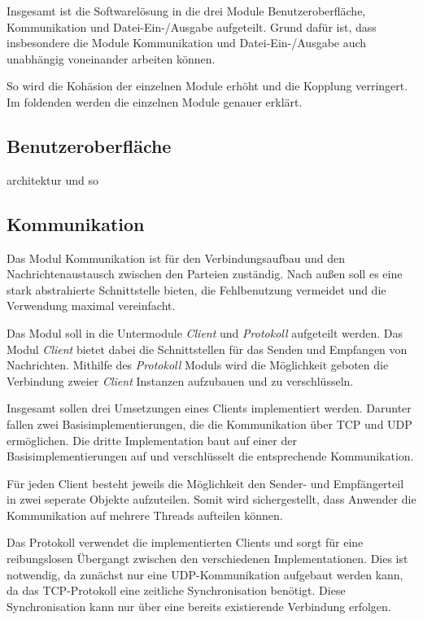 \label{sc:architektur}

Insgesamt ist die Softwarelösung in die drei Module Benutzeroberfläche, Kommunikation und Datei-Ein-/Ausgabe aufgeteilt. Grund dafür ist, dass insbesondere die Module Kommunikation und Datei-Ein-/Ausgabe auch unabhängig voneinander arbeiten können.

So wird die Kohäsion der einzelnen Module erhöht und die Kopplung verringert. Im foldenden werden die einzelnen Module genauer erklärt.

\subsection{Benutzeroberfläche}
architektur und so

\subsection{Kommunikation}
Das Modul Kommunikation ist für den Verbindungsaufbau und den Nachrichtenaustausch zwischen den Parteien zuständig. Nach außen soll es eine stark abstrahierte Schnittstelle bieten, die Fehlbenutzung vermeidet und die Verwendung maximal vereinfacht.

Das Modul soll in die Untermodule \textit{Client} und \textit{Protokoll} aufgeteilt werden. Das Modul \textit{Client} bietet dabei die Schnittstellen für das Senden und Empfangen von Nachrichten. Mithilfe des \textit{Protokoll} Moduls wird die Möglichkeit geboten die Verbindung zweier \textit{Client} Instanzen aufzubauen und zu verschlüsseln.

Insgesamt sollen drei Umsetzungen eines Clients implementiert werden. Darunter fallen zwei Basisimplementierungen, die die Kommunikation über TCP und UDP ermöglichen. Die dritte Implementation baut auf einer der Basisimplementierungen auf und verschlüsselt die entsprechende Kommunikation.

Für jeden Client besteht jeweils die Möglichkeit den Sender- und Empfängerteil in zwei seperate Objekte aufzuteilen. Somit wird sichergestellt, dass Anwender die Kommunikation auf mehrere Threads aufteilen können.

Das Protokoll verwendet die implementierten Clients und sorgt für eine reibungslosen Übergangt zwischen den verschiedenen Implementationen. Dies ist notwendig, da zunächst nur eine UDP-Kommunikation aufgebaut werden kann, da das TCP-Protokoll eine zeitliche Synchronisation benötigt. Diese Synchronisation kann nur über eine bereits existierende Verbindung erfolgen.

